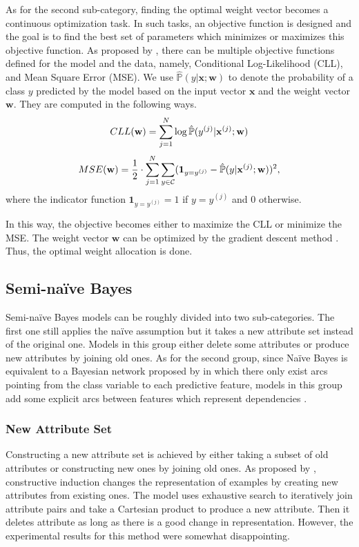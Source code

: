 \documentclass[twoside,11pt]{article}
\begin{document}
As for the second sub-category, finding the optimal weight vector becomes a continuous optimization task. In such tasks, an objective function is designed and the goal is to find the best set of parameters which minimizes or maximizes this objective function. As proposed by \citet{zaidi2013alleviating}, there can be multiple objective functions defined for the model and the data, namely, Conditional Log-Likelihood (CLL), and Mean Square Error (MSE). We use $\hat{\mathbb{P}}(y|\mathbf{x};\mathbf{w})$ to denote the probability of a class $y$ predicted by the model based on the input vector $\mathbf{x}$ and the weight vector $\mathbf{w}$. They are computed in the following ways.
\begin{equation*}
    \centering
    CLL(\mathbf{w})=\sum_{j=1}^{N} \log \hat{\mathbb{P}}(y^{(j)}|\mathbf{x}^{(j)};\mathbf{w})
\end{equation*}
\begin{equation*}
    \centering
    MSE(\mathbf{w})=\frac{1}{2}\cdot\sum_{j=1}^{N}\sum_{y\in\mathcal{C}}(\mathbf{1}_{y=y^{(j)}}-\hat{\mathbb{P}}(y|\mathbf{x}^{(j)};\mathbf{w}))^2,
\end{equation*}
where the indicator function $\mathbf{1}_{y=y^{(j)}}=1$ if $y=y^{(j)}$ and $0$ otherwise.

In this way, the objective becomes either to maximize the CLL or minimize the MSE. The weight vector $\mathbf{w}$ can be optimized by the gradient descent method \citep{ruder2016overview}. Thus, the optimal weight allocation is done.


\subsection{Semi-na\"ive Bayes}
Semi-na\"ive Bayes models can be roughly divided into two sub-categories. The first one still applies the na\"ive assumption but it takes a new attribute set instead of the original one. Models in this group either delete some attributes or produce new attributes by joining old ones. As for the second group, since Na\"ive Bayes is equivalent to a Bayesian network proposed by \citet{pearl2014probabilistic} in which there only exist arcs pointing from the class variable to each predictive feature, models in this group add some explicit arcs between features which represent dependencies \citep{zheng2005comparative}.

\subsubsection{New Attribute Set}
Constructing a new attribute set is achieved by either taking a subset of old attributes or constructing new ones by joining old ones. As proposed by \citet{pazzani1998constructive}, constructive induction changes the representation of examples by creating new attributes from existing ones. The model uses exhaustive search to iteratively join attribute pairs and take a Cartesian product to produce a new attribute. Then it deletes attribute as long as there is a good change in representation. However, the experimental results for this method were somewhat disappointing.
\end{document}
